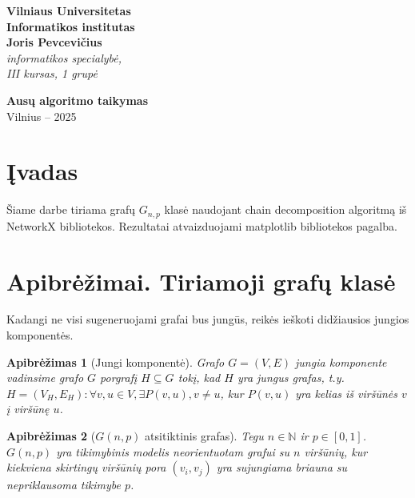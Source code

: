 \documentclass[bibliography=totoc]{article}
\newtheorem{definition}{Apibrėžimas}
\begin{document}
\begin{titlepage}
    \begin{center}
        \vspace*{1cm}
 
        \Huge
        \textbf{Vilniaus Universitetas}\\
         \textbf{Informatikos institutas}\\
        
        \vspace{6.5cm}
        \textbf{Joris Pevcevičius}\\
       \textit{ informatikos specialybė, \\
                 III kursas, 1 grupė\\}
        
        \textbf{Ausų algoritmo taikymas}\\
          
                 
 
        \vfill
        Vilnius -- 2025
    \end{center}
\end{titlepage}
\tableofcontents
\newpage
\section*{Įvadas}
\label{sec:ivadas}
Šiame darbe tiriama grafų $G_{n,p}$ klasė naudojant chain decomposition algoritmą \citep{schmidt2013simple} iš NetworkX bibliotekos. Rezultatai atvaizduojami matplotlib bibliotekos pagalba.

\newpage
\section{Apibrėžimai. Tiriamoji grafų klasė}

Kadangi ne visi sugeneruojami grafai bus jungūs, reikės ieškoti didžiausios jungios komponentės.
\begin{definition}[Jungi komponentė]\citep{Graf}
Grafo $G=(V,E)$ jungia komponente vadinsime grafo $G$ porgrafį $H\subseteq G$ tokį, kad $H$ yra jungus grafas, t.y.
$H=(V_H, E_H): \forall v,u\in V, \exists P(v,u), v\neq u$, kur $P(v,u)$ yra kelias iš viršūnės $v$ į viršūnę $u$.
\end{definition}

\begin{definition}[$G(n,p)$ atsitiktinis grafas]
Tegu $n \in \mathbb{N}$ ir $p \in [0,1]$. $G(n, p)$ yra tikimybinis modelis neorientuotam grafui su $n$ viršūnių, kur kiekviena skirtingų viršūnių pora $(v_i, v_j)$ yra sujungiama briauna su nepriklausoma tikimybe $p$.
\end{definition}
\end{document}
